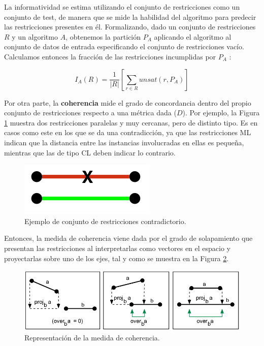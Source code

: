 La informatividad se estima utilizando el conjunto de restricciones como un conjunto de test, de manera que se mide la habilidad del algoritmo para predecir las restricciones presentes en él. Formalizando, dado un conjunto de restricciones $R$ y un algoritmo $A$, obtenemos la partición $P_A$ aplicando el algoritmo al conjunto de datos de entrada especificando el conjunto de restricciones vacío. Calculamos entonces la fracción de las restricciones incumplidas por $P_A$ \cite{davidson2007survey}:

\begin{equation}
I_A(R) = \frac{1}{|R|}\left[ \sum_{r \in R} unsat(r, P_A) \right] 
\end{equation}

\clearpage

Por otra parte, la \textbf{coherencia} mide el grado de concordancia dentro del propio conjunto de restricciones respecto a una métrica dada ($D$). Por ejemplo, la Figura \ref{fig:figure17} muestra dos restricciones paralelas y muy cercanas, pero de distinto tipo. Es en casos como este en los que se da una contradicción, ya que las restricciones \acf{ML} indican que la distancia entre las instancias involucradas en ellas es pequeña, mientras que las de tipo \acf{CL} deben indicar lo contrario.

\begin{figure}[!h]
	\centering
	\includegraphics[scale=0.4]{gfx/ConstClust/Coherencia/Coher1}
	\caption[Ejemplo de conjunto de restricciones contradictorio.]{Ejemplo de conjunto de restricciones contradictorio. \cite{davidson2007survey}}\label{fig:figure17}
\end{figure}

Entonces, la medida de coherencia viene dada por el grado de solapamiento que presentan las restricciones al interpretarlas como vectores en el espacio y proyectarlas sobre uno de los ejes, tal y como se muestra en la Figura \ref{fig:figure18}.

\begin{figure}[!h]
	\centering
	\includegraphics[scale=0.4]{gfx/ConstClust/Coherencia/Coher2}
	\caption[Representación de la medida de coherencia.]{Representación de la medida de coherencia. \cite{davidson2007survey}}\label{fig:figure18}
\end{figure}

